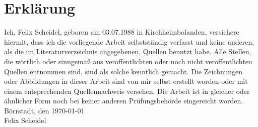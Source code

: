 \section*{Erklärung}
 
 
\normalsize
Ich, Felix Scheidel, geboren am 03.07.1988 in Kirchheimbolanden, versichere hiermit, dass ich die vorliegende Arbeit selbstständig verfasst und keine anderen, als die im Literaturverzeichnis angegebenen, Quellen benutzt habe.
\newline
Alle Stellen, die wörtlich oder sinngemäß aus veröffentlichten oder noch nicht veröffentlichten Quellen entnommen sind, sind als solche kenntlich gemacht. Die Zeichnungen oder Abbildungen in dieser Arbeit sind von mir selbst erstellt worden oder mit einem entsprechenden Quellennachweis versehen.
\newline\newline
Die Arbeit ist in gleicher oder ähnlicher Form noch bei keiner anderen Prüfungsbehörde eingereicht worden.
\vspace{5em}
\\ Börrstadt, den \today \\ Felix Scheidel
\newpage
